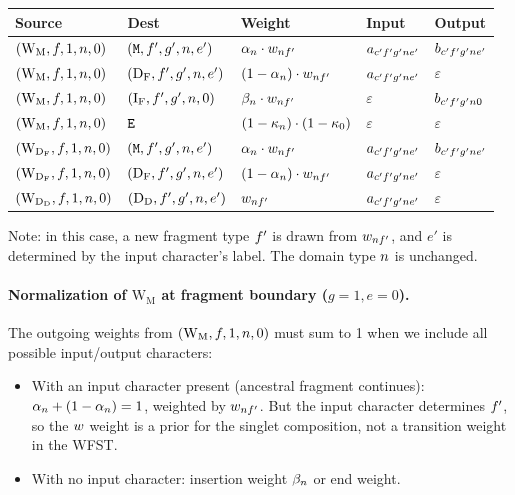 \begin{center}
\renewcommand{\arraystretch}{1.5}
\begin{tabular}{lllll}
\hline
Source & Dest & Weight & Input & Output \\
\hline
$(\mathrm{W_M}, f, 1, n, 0)$ &
  $({\tt M}, f', g', n, e')$ &
  $\alpha_n \cdot w_{nf'}$ &
  $a_{c'f' g'n e'}$ &
  $b_{c'f' g'n e'}$ \\
$(\mathrm{W_M}, f, 1, n, 0)$ &
  $(\mathrm{D_F}, f', g', n, e')$ &
  $(1-\alpha_n) \cdot w_{nf'}$ &
  $a_{c'f' g'n e'}$ &
  $\varepsilon$ \\
$(\mathrm{W_M}, f, 1, n, 0)$ &
  $(\mathrm{I_F}, f', g', n, 0)$ &
  $\beta_n \cdot w_{nf'}$ &
  $\varepsilon$ &
  $b_{c'f' g'n 0}$ \\
$(\mathrm{W_M}, f, 1, n, 0)$ &
  ${\tt E}$ &
  $(1-\kappa_n) \cdot (1-\kappa_0)$ &
  $\varepsilon$ &
  $\varepsilon$ \\
\hline
$(\mathrm{W_{D_F}}, f, 1, n, 0)$ &
  $({\tt M}, f', g', n, e')$ &
  $\alpha_n \cdot w_{nf'}$ &
  $a_{c'f' g'n e'}$ &
  $b_{c'f' g'n e'}$ \\
$(\mathrm{W_{D_F}}, f, 1, n, 0)$ &
  $(\mathrm{D_F}, f', g', n, e')$ &
  $(1-\alpha_n) \cdot w_{nf'}$ &
  $a_{c'f' g'n e'}$ &
  $\varepsilon$ \\
\hline
$(\mathrm{W_{D_D}}, f, 1, n, 0)$ &
  $(\mathrm{D_D}, f', g', n, e')$ &
  $w_{nf'}$ &
  $a_{c'f' g'n e'}$ &
  $\varepsilon$ \\
\hline
\end{tabular}
\end{center}

Note: in this case, a new fragment type $f'$ is drawn from $w_{nf'}$,
and $e'$ is determined by the input character's label.
The domain type $n$ is unchanged.

\paragraph{Normalization of $\mathrm{W_M}$ at fragment boundary ($g=1, e=0$).}
The outgoing weights from $(\mathrm{W_M}, f, 1, n, 0)$ must sum to 1 when
we include all possible input/output characters:
\begin{itemize}
\item With an input character present (ancestral fragment continues):
  $\alpha_n + (1 - \alpha_n) = 1$, weighted by $w_{nf'}$.
  But the input character determines $f'$, so the $w$ weight is a prior
  for the singlet composition, not a transition weight in the WFST.
\item With no input character:
  insertion weight $\beta_n$ or end weight.
\end{itemize}

